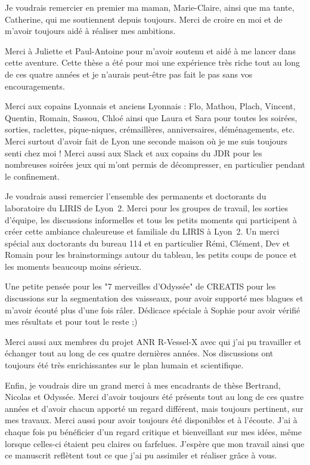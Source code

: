%
\label{sec:Remerciements}



Je voudrais remercier en premier ma maman, Marie-Claire, ainsi que ma tante, Catherine, qui me soutiennent depuis toujours. Merci de croire en moi et de m'avoir toujours aidé à réaliser mes ambitions. 

Merci à Juliette et Paul-Antoine pour m'avoir soutenu et aidé à me lancer dans cette aventure. Cette thèse a été pour moi une expérience très riche tout au long de ces quatre années et je n'aurais peut-être pas fait le pas sans vos encouragements.

Merci aux copains Lyonnais et anciens Lyonnais : Flo, Mathou, Plach, Vincent, Quentin, Romain, Sassou, Chloé ainsi que Laura et Sara pour toutes les soirées, sorties, raclettes, pique-niques, crémaillères, anniversaires, déménagements, etc. Merci surtout d'avoir fait de Lyon une seconde maison où je me suis toujours senti chez moi ! Merci aussi aux Slack et aux copains du JDR pour les nombreuses soirées jeux qui m'ont permis de décompresser, en particulier pendant le confinement. 

Je voudrais aussi remercier l'ensemble des permanents et doctorants du laboratoire du LIRIS de Lyon~2. Merci pour les groupes de travail, les sorties d'équipe, les discussions informelles et tous les petits moments qui participent à créer cette ambiance chaleureuse et familiale du LIRIS à Lyon~2. Un merci spécial aux doctorants du bureau 114 et en particulier Rémi, Clément, Dev et Romain pour les brainstormings autour du tableau, les petits coups de pouce et les moments beaucoup moins sérieux.

Une petite pensée pour les "7 merveilles d'Odyssée" de CREATIS pour les discussions sur la segmentation des vaisseaux, pour avoir supporté mes blagues et m'avoir écouté plus d'une fois râler. Dédicace spéciale à Sophie pour avoir vérifié mes résultats et pour tout le reste ;)

Merci aussi aux membres du projet ANR R-Vessel-X avec qui j'ai pu travailler et échanger tout au long de ces quatre dernières années. Nos discussions ont toujours été très enrichissantes sur le plan humain et scientifique.

Enfin, je voudrais dire un grand merci à mes encadrants de thèse Bertrand, Nicolas et Odyssée. Merci d'avoir toujours été présents tout au long de ces quatre années et d'avoir chacun apporté un regard différent, mais toujours pertinent, sur mes travaux. Merci aussi pour avoir toujours été disponibles et à l'écoute. J'ai à chaque fois pu bénéficier d'un regard critique et bienveillant sur mes idées, même lorsque celles-ci étaient peu claires ou farfelues. J'espère que mon travail ainsi que ce manuscrit reflètent tout ce que j'ai pu assimiler et réaliser grâce à vous.

